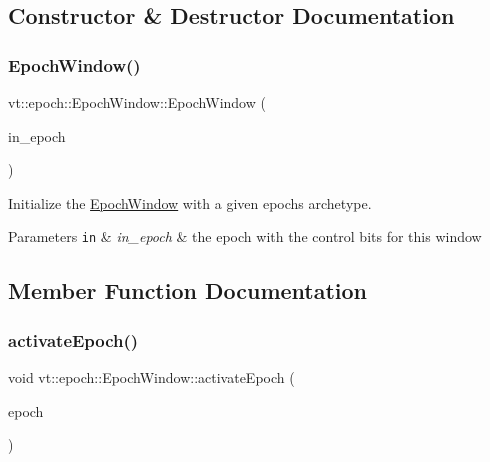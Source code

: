 \subsection{Constructor \& Destructor Documentation}
\mbox{\label{structvt_1_1epoch_1_1_epoch_window_ab0d58ee25bf04051ac80ff32a4fcd8e5}} 
\subsubsection{\texorpdfstring{Epoch\+Window()}{EpochWindow()}}
{\footnotesize\ttfamily vt\+::epoch\+::\+Epoch\+Window\+::\+Epoch\+Window (\begin{DoxyParamCaption}\item[{\hyperlink{structvt_1_1epoch_1_1_epoch_type}{Epoch\+Type}}]{in\+\_\+epoch }\end{DoxyParamCaption})\hspace{0.3cm}{\ttfamily [explicit]}}



Initialize the {\ttfamily \hyperlink{structvt_1_1epoch_1_1_epoch_window}{Epoch\+Window}} with a given epoch\textquotesingle{}s archetype. 


\begin{DoxyParams}[1]{Parameters}
\mbox{\tt in}  & {\em in\+\_\+epoch} & the epoch with the control bits for this window \\
\hline
\end{DoxyParams}


\subsection{Member Function Documentation}
\mbox{\label{structvt_1_1epoch_1_1_epoch_window_a6efc8f11ec346d89ebbfcb36069b6e78}} 
\subsubsection{\texorpdfstring{activate\+Epoch()}{activateEpoch()}}
{\footnotesize\ttfamily void vt\+::epoch\+::\+Epoch\+Window\+::activate\+Epoch (\begin{DoxyParamCaption}\item[{\hyperlink{structvt_1_1epoch_1_1_epoch_type}{Epoch\+Type}}]{epoch }\end{DoxyParamCaption})}



